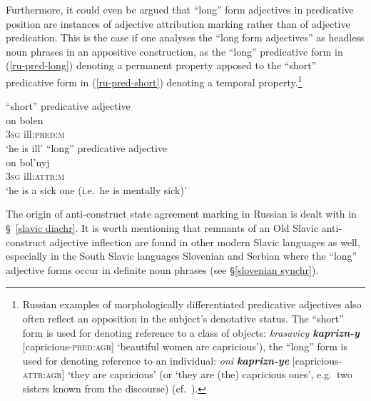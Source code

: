 Furthermore, it could even be argued that “long” form adjectives in predicative position are instances of adjective attribution marking rather than of adjective predication. This is the case if one analyses the “long form adjectives” as headless noun phrases in an appositive construction, as the “long” predicative form in (\ref{ru-pred-long}) denoting a permanent property apposed to the “short” predicative form in (\ref{ru-pred-short}) denoting a temporal property.\footnote{Russian examples of morphologically differentiated predicative adjectives also often reflect an opposition in the subject's denotative status. The “short” form is used for denoting reference to a class of objects: \textit{krasavicy \textbf{kaprizn-y}} [capricious-\textsc{pred:agr}] ‘beautiful women are capricious’), the “long” form is used for denoting reference to an individual: \textit{oni \textbf{kaprizn-ye}} [capricious-\textsc{attr:agr}] ‘they are capricious’ (or ‘they are (the) capricious ones’, e.g.~two sisters known from the discourse) (cf.~\citealt[210 Footnote 76]{mendoza2004}).}
\begin{exe}
\ex
{}
\begin{xlist}
\ex \rm{“short” predicative adjective}\\
\gll on bolen\\
	3\textsc{sg} ill:\textsc{pred:m}\\
\glt	 ‘he is ill’\label{ru-pred-short}
\ex \rm{“long” predicative adjective}\\
\gll on bol'nyj\\
	3\textsc{sg} ill:\textsc{attr:m}\\
\glt	 ‘he is a sick one (i.e.~he is mentally sick)’\label{ru-pred-long}
\end{xlist}
\end{exe}
The origin of anti\hyp{}construct state agreement marking in Russian is dealt with in \S~\ref{slavic diachr}. It is worth mentioning that remnants of an Old Slavic anti\hyp{}construct adjective inflection are found in other modern Slavic languages as well, especially in the South Slavic languages Slovenian and Serbian where the “long” adjective forms occur in definite noun phrases (see \S \ref{slovenian synchr}).

